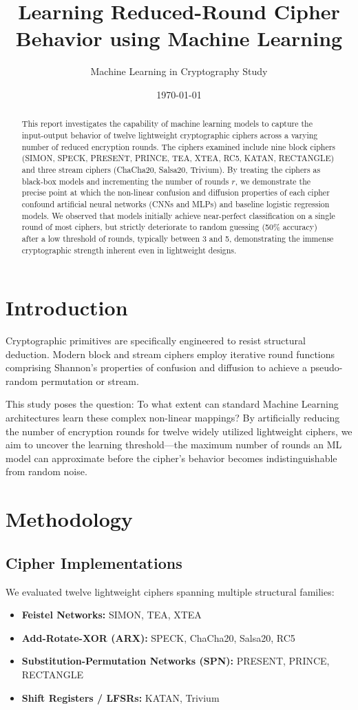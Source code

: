 \documentclass[11pt,a4paper]{article}
\title{\textbf{Learning Reduced-Round Cipher Behavior using Machine Learning}}
\author{Machine Learning in Cryptography Study}
\date{\today}
\begin{document}
\maketitle

\begin{abstract}
This report investigates the capability of machine learning models to capture the input-output behavior of twelve lightweight cryptographic ciphers across a varying number of reduced encryption rounds. The ciphers examined include nine block ciphers (SIMON, SPECK, PRESENT, PRINCE, TEA, XTEA, RC5, KATAN, RECTANGLE) and three stream ciphers (ChaCha20, Salsa20, Trivium). By treating the ciphers as black-box models and incrementing the number of rounds $r$, we demonstrate the precise point at which the non-linear confusion and diffusion properties of each cipher confound artificial neural networks (CNNs and MLPs) and baseline logistic regression models.  We observed that models initially achieve near-perfect classification on a single round of most ciphers, but strictly deteriorate to random guessing (50\% accuracy) after a low threshold of rounds, typically between 3 and 5, demonstrating the immense cryptographic strength inherent even in lightweight designs.
\end{abstract}

\section{Introduction}
Cryptographic primitives are specifically engineered to resist structural deduction. Modern block and stream ciphers employ iterative round functions comprising Shannon's properties of confusion and diffusion to achieve a pseudo-random permutation or stream.

This study poses the question: To what extent can standard Machine Learning architectures learn these complex non-linear mappings? By artificially reducing the number of encryption rounds for twelve widely utilized lightweight ciphers, we aim to uncover the learning threshold—the maximum number of rounds an ML model can approximate before the cipher's behavior becomes indistinguishable from random noise.

\section{Methodology}

\subsection{Cipher Implementations}
We evaluated twelve lightweight ciphers spanning multiple structural families:
\begin{itemize}
    \item \textbf{Feistel Networks:} SIMON, TEA, XTEA
    \item \textbf{Add-Rotate-XOR (ARX):} SPECK, ChaCha20, Salsa20, RC5
    \item \textbf{Substitution-Permutation Networks (SPN):} PRESENT, PRINCE, RECTANGLE
    \item \textbf{Shift Registers / LFSRs:} KATAN, Trivium
\end{itemize}
\end{document}
